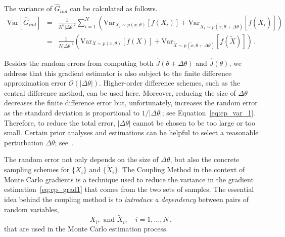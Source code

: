 \documentclass[12pt]{amsart}
\begin{document}
The variance of $\widehat{G}_{ind}$ can be calculated as follows.
\begin{eqnarray}
\text{Var}[\widehat{G}_{ind}] &=& \frac{1}{N^2 |\Delta \theta|^2} \sum_{i=1}^N 
 \left( \text{Var}_{X_i\sim p(x,\theta)} [f(X_i)] + \text{Var}_{\tilde X_i\sim p(\tilde{x},\theta+\Delta \theta)} [f(\tilde X_i)]   \right) \nonumber \\
 &=& \frac{1}{N |\Delta \theta|^2 } \left(\text{Var}_{X\sim p(x,\theta)} [f(X)] + \text{Var}_{\tilde X\sim p(\tilde{x},\theta+\Delta \theta)} [f(\tilde X)] \right)\,. \label{eq:cp_var_1}
\end{eqnarray}


Besides the random errors from computing both $\widehat{J}(\theta + \Delta \theta)$ and $\widehat{J}(\theta)$,  we address that this gradient estimator is also subject to the finite difference approximation error $\mathcal{O}(|\Delta \theta|)$. Higher-order difference schemes, such as the central difference method, can be used here. Moreover, reducing the size of $\Delta \theta$  decreases the finite difference error but, unfortunately, increases the random error as the standard deviation is proportional to $1/|\Delta \theta|$; see Equation~\eqref{eq:cp_var_1}. Therefore, to reduce the total error, $|\Delta \theta|$ cannot be chosen to be too large or too small. Certain prior analyses and estimations can be helpful to select a reasonable perturbation $\Delta \theta$; see~\cite[Sec.~6.1]{caflisch2021adjoint}.


The random error not only depends on the size of  $\Delta \theta$,  but also the concrete sampling schemes for $\{X_i\}$ and $\{\tilde X_i\}$.  The Coupling Method in the context of Monte Carlo gradients is a technique used to reduce the variance in the gradient estimation~\eqref{eq:cp_grad1} that comes from the two sets of samples. The essential idea behind the coupling method is to \textit{introduce a dependency} between pairs of random variables, 
$$
X_i, \text{ and } \tilde X_i,\quad i = 1,\dots, N\,,
$$
that are used in the Monte Carlo estimation process.  
\end{document}
